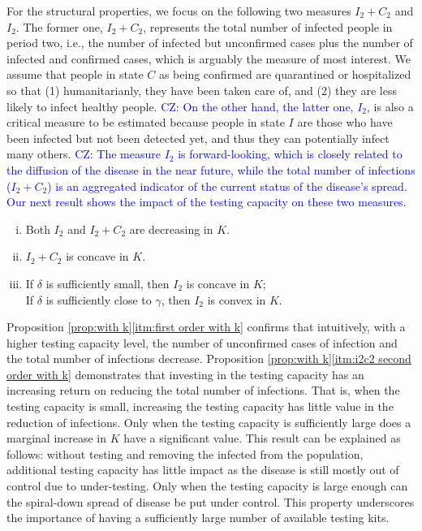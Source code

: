 \documentclass[nonblindrev, copyedit]{informs3a}
\newcommand\cz[1]{\textcolor{blue}{CZ: #1}}
\newcounter{prop}[chapter]
\begin{document}
For the structural properties, we focus on the following two measures $I_2+C_2$ and $I_2$.
The former one, $I_2+C_2$, represents the total number of infected people in period two, i.e., the number of infected but unconfirmed cases plus the number of infected and confirmed cases, which is arguably the measure of most interest. We assume that people in state $C$ as being confirmed are quarantined or hospitalized so that (1) humanitarianly, they have been taken care of, and (2) they are less likely to infect healthy people. \cz{On the other hand, the latter one, $I_2$, }is also a critical measure to be estimated because people in state $I$ are those who have been infected but not been detected yet, and thus they can potentially infect many others.
\cz{The measure $I_2$ is forward-looking, which is closely related to the diffusion of the disease in the near future, while the total number of infections ($I_2+C_2$) is an aggregated indicator of the current status of the disease's spread.
Our next result shows the impact of the testing capacity on these two measures.}
\begin{proposition}
\label{prop:with k}
\begin{enumerate}[(i)]
    \item\label{itm:first order with k} Both $I_2$ and $I_2+C_2$ are decreasing in $K$.
    \item\label{itm:i2c2 second order with k} $I_2+C_2$ is concave in $K$.
    \item\label{itm:i2 second order with k} If $\delta$ is sufficiently small, then $I_2$ is concave in $K$;\\ If $\delta$ is sufficiently close to $\gamma$, then $I_2$ is convex in $K$.
\end{enumerate}
\end{proposition}

Proposition \ref{prop:with k}\eqref{itm:first order with k} confirms that intuitively, with a higher testing capacity level, the number of unconfirmed cases of infection and the total number of infections decrease.
Proposition \ref{prop:with k}\eqref{itm:i2c2 second order with k} demonstrates that investing in the testing capacity has an increasing return on reducing the total number of infections.
That is, when the testing capacity is small, increasing the testing capacity has little value in the reduction of infections. Only when the testing capacity is sufficiently large does a marginal increase in $K$ have a significant value.
This result can be explained as follows: without testing and removing the infected from the population, additional testing capacity has little impact as the disease is still mostly out of control due to under-testing.
Only when the testing capacity is large enough can the spiral-down spread of disease be put under control.
This property underscores the importance of having a sufficiently large number of available testing kits.
\end{document}
